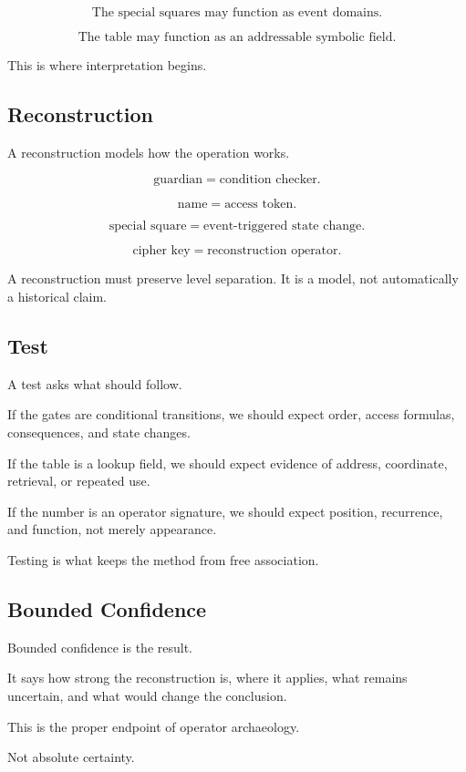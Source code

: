 \documentclass[11pt]{book}
\begin{document}
\[
\text{The special squares may function as event domains.}
\]

\[
\text{The table may function as an addressable symbolic field.}
\]

This is where interpretation begins.

\subsection{Reconstruction}

A reconstruction models how the operation works.

\[
\text{guardian} = \text{condition checker}.
\]

\[
\text{name} = \text{access token}.
\]

\[
\text{special square} = \text{event-triggered state change}.
\]

\[
\text{cipher key} = \text{reconstruction operator}.
\]

A reconstruction must preserve level separation. It is a model, not automatically a historical claim.

\subsection{Test}

A test asks what should follow.

If the gates are conditional transitions, we should expect order, access formulas, consequences, and state changes.

If the table is a lookup field, we should expect evidence of address, coordinate, retrieval, or repeated use.

If the number is an operator signature, we should expect position, recurrence, and function, not merely appearance.

Testing is what keeps the method from free association.

\subsection{Bounded Confidence}

Bounded confidence is the result.

It says how strong the reconstruction is, where it applies, what remains uncertain, and what would change the conclusion.

This is the proper endpoint of operator archaeology.

Not absolute certainty.
\end{document}
